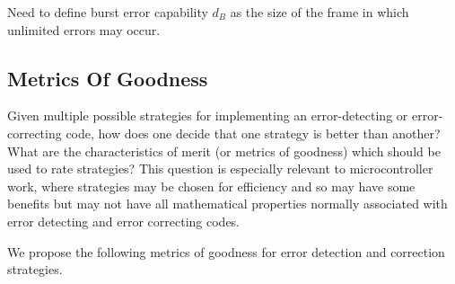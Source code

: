 Need to define burst error capability $d_B$ as the size of the frame
in which unlimited errors may occur.



\subsection{Metrics Of Goodness}
\label{cedc0:scon0:smgo0}

Given multiple possible strategies for implementing an error-detecting
or error-correcting code, how does one decide that one strategy is 
better than another?  What are the characteristics of merit
(or metrics of goodness) which should be used to rate strategies?  This 
question is especially relevant to microcontroller work, where strategies may
be chosen for efficiency and so may have some benefits but may not 
have all mathematical properties normally associated with error detecting 
and error correcting codes.

We propose the following metrics of goodness for error detection and correction
strategies.

